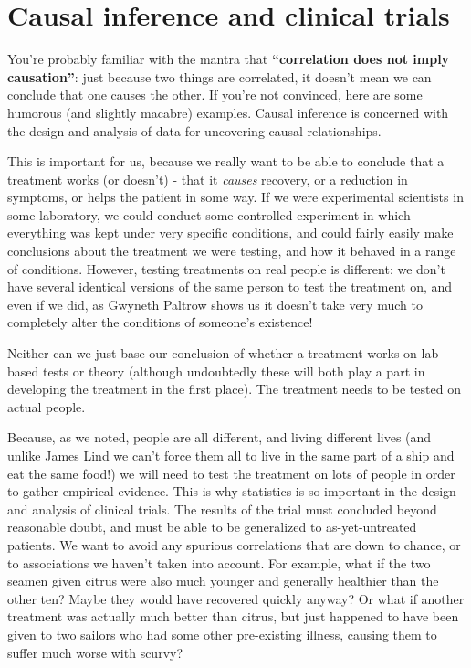 \documentclass[
  openany]{book}
\theoremstyle{definition}
\theoremstyle{definition}
\theoremstyle{definition}
\theoremstyle{definition}
\theoremstyle{remark}
\begin{document}
\section{Causal inference and clinical trials}\label{causal-inference-and-clinical-trials}

You're probably familiar with the mantra that \textbf{``correlation does not imply causation''}: just because two things are correlated, it doesn't mean we can conclude that one causes the other. If you're not convinced, \href{https://www.tylervigen.com/spurious-correlations}{here} are some humorous (and slightly macabre) examples. Causal inference is concerned with the design and analysis of data for uncovering causal relationships.

This is important for us, because we really want to be able to conclude that a treatment works (or doesn't) - that it \emph{causes} recovery, or a reduction in symptoms, or helps the patient in some way.
If we were experimental scientists in some laboratory, we could conduct some controlled experiment in which everything was kept under very specific conditions, and could fairly easily make conclusions about the treatment we were testing, and how it behaved in a range of conditions. However, testing treatments on real people is different: we don't have several identical versions of the same person to test the treatment on, and even if we did, as Gwyneth Paltrow shows us it doesn't take very much to completely alter the conditions of someone's existence!

Neither can we just base our conclusion of whether a treatment works on lab-based tests or theory (although undoubtedly these will both play a part in developing the treatment in the first place). The treatment needs to be tested on actual people.

Because, as we noted, people are all different, and living different lives (and unlike James Lind we can't force them all to live in the same part of a ship and eat the same food!) we will need to test the treatment on lots of people in order to gather empirical evidence. This is why statistics is so important in the design and analysis of clinical trials. The results of the trial must concluded beyond reasonable doubt, and must be able to be generalized to as-yet-untreated patients. We want to avoid any spurious correlations that are down to chance, or to associations we haven't taken into account. For example, what if the two seamen given citrus were also much younger and generally healthier than the other ten? Maybe they would have recovered quickly anyway? Or what if another treatment was actually much better than citrus, but just happened to have been given to two sailors who had some other pre-existing illness, causing them to suffer much worse with scurvy?
\end{document}
